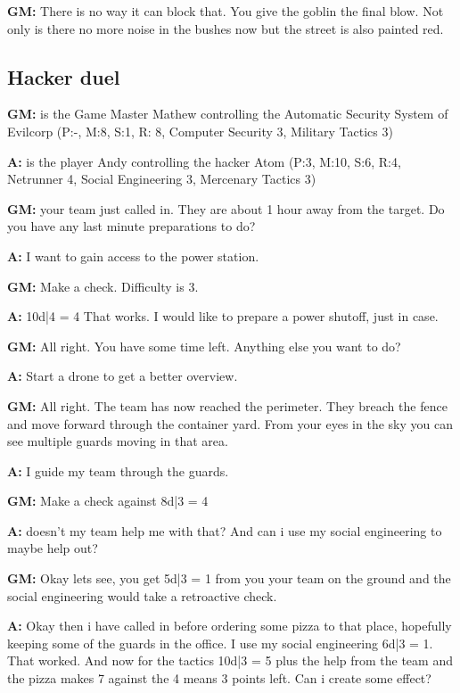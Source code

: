 \documentclass[11pt]{article}
\begin{document}
{\begin{multicols}{2}[]
\textbf{GM:} There is no way it can block that. You give the goblin the final blow. Not only is there no more noise in the bushes now but the street is also painted red.

\subsection{Hacker duel}
\label{sec:org1e07c25}

\textbf{GM:} is the Game Master Mathew controlling the Automatic Security System of Evilcorp (P:-, M:8, S:1, R: 8, Computer Security 3, Military Tactics 3)

\textbf{A:} is the player Andy controlling the hacker Atom (P:3, M:10, S:6, R:4, Netrunner 4, Social Engineering 3, Mercenary Tactics 3)

\textbf{GM:} your team just called in. They are about 1 hour away from the target. Do you have any last minute preparations to do?

\textbf{A:} I want to gain access to the power station.

\textbf{GM:} Make a check. Difficulty is 3.

\textbf{A:} 10d|4 = 4 That works. I would like to prepare a power shutoff, just in case.

\textbf{GM:} All right. You have some time left. Anything else you want to do?

\textbf{A:} Start a drone to get a better overview.

\textbf{GM:} All right. The team has now reached the perimeter. They breach the fence and move forward through the container yard. From your eyes in the sky you can see multiple guards moving in that area.

\textbf{A:} I guide my team through the guards.

\textbf{GM:} Make a check against 8d|3 = 4

\textbf{A:} doesn't my team help me with that? And can i use my social engineering to maybe help out?

\textbf{GM:} Okay lets see, you get 5d|3 = 1 from you your team on the ground and the social engineering would take a retroactive check.

\textbf{A:} Okay then i have called in before ordering some pizza to that place, hopefully keeping some of the guards in the office. I use my social engineering 6d|3 = 1. That worked. And now for the tactics 10d|3 = 5 plus the help from the team and the pizza makes 7 against the 4 means 3 points left. Can i create some effect?


\end{multicols}}
\end{document}
